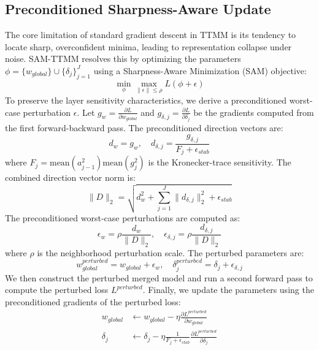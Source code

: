 \documentclass{article}
\theoremstyle{plain}
\theoremstyle{definition}
\theoremstyle{remark}
\begin{document}
\subsection{Preconditioned Sharpness-Aware Update}
The core limitation of standard gradient descent in TTMM is its tendency to locate sharp, overconfident minima, leading to representation collapse under noise. SAM-TTMM resolves this by optimizing the parameters $\phi = \{w_{global}\} \cup \{\delta_j\}_{j=1}^J$ using a Sharpness-Aware Minimization (SAM) objective:
\begin{equation}
    \min_{\phi} \max_{\|\epsilon\| \le \rho} L(\phi + \epsilon)
\end{equation}
To preserve the layer sensitivity characteristics, we derive a preconditioned worst-case perturbation $\epsilon$. Let $g_w = \frac{\partial L}{\partial w_{global}}$ and $g_{\delta, j} = \frac{\partial L}{\partial \delta_j}$ be the gradients computed from the first forward-backward pass. The preconditioned direction vectors are:
\begin{equation}
    d_w = g_w, \quad d_{\delta, j} = \frac{g_{\delta, j}}{F_j + \epsilon_{stab}}
\end{equation}
where $F_j = \text{mean}(a_{j-1}^2)\text{mean}(g_j^2)$ is the Kronecker-trace sensitivity. The combined direction vector norm is:
\begin{equation}
    \|D\|_2 = \sqrt{d_w^2 + \sum_{j=1}^J \|d_{\delta, j}\|_2^2 + \epsilon_{stab}}
\end{equation}
The preconditioned worst-case perturbations are computed as:
\begin{equation}
    \epsilon_w = \rho \frac{d_w}{\|D\|_2}, \quad \epsilon_{\delta, j} = \rho \frac{d_{\delta, j}}{\|D\|_2}
\end{equation}
where $\rho$ is the neighborhood perturbation scale. The perturbed parameters are:
\begin{equation}
    w_{global}^{perturbed} = w_{global} + \epsilon_w, \quad \delta_j^{perturbed} = \delta_j + \epsilon_{\delta, j}
\end{equation}
We then construct the perturbed merged model and run a second forward pass to compute the perturbed loss $L^{perturbed}$. Finally, we update the parameters using the preconditioned gradients of the perturbed loss:
\begin{align}
    w_{global} &\leftarrow w_{global} - \eta \frac{\partial L^{perturbed}}{\partial w_{global}} \\
    \delta_j &\leftarrow \delta_j - \eta \frac{1}{F_j + \epsilon_{stab}} \frac{\partial L^{perturbed}}{\partial \delta_j}
\end{align}
\end{document}
